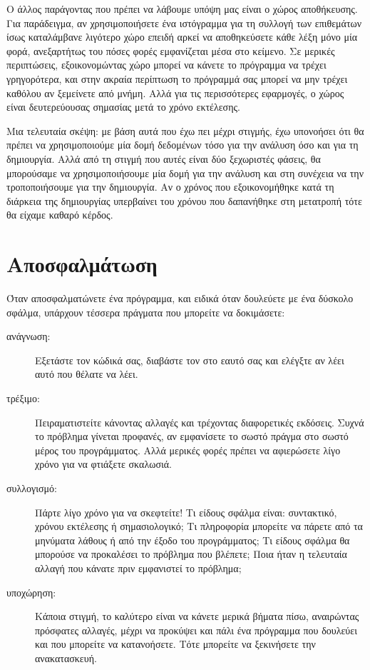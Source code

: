\documentclass[10pt]{book}
\begin{document}
Ο άλλος παράγοντας που πρέπει να λάβουμε υπόψη μας είναι ο χώρος αποθήκευσης. Για παράδειγμα, αν χρησιμοποιήσετε ένα ιστόγραμμα για τη συλλογή των επιθεμάτων ίσως καταλάμβανε λιγότερο χώρο επειδή αρκεί να αποθηκεύσετε κάθε λέξη μόνο μία φορά, ανεξαρτήτως του πόσες φορές εμφανίζεται μέσα στο κείμενο. Σε μερικές περιπτώσεις, εξοικονομώντας χώρο μπορεί να κάνετε το πρόγραμμα να τρέχει γρηγορότερα, και στην ακραία περίπτωση το πρόγραμμά σας μπορεί να μην τρέχει καθόλου αν ξεμείνετε από μνήμη. Αλλά για τις περισσότερες εφαρμογές, ο χώρος είναι δευτερεύουσας σημασίας μετά το χρόνο εκτέλεσης.

Μια τελευταία σκέψη: με βάση αυτά που έχω πει μέχρι στιγμής, έχω υπονοήσει ότι θα πρέπει να χρησιμοποιούμε μία 
δομή δεδομένων τόσο για την ανάλυση όσο και για τη δημιουργία. Αλλά από τη στιγμή που αυτές είναι δύο ξεχωριστές φάσεις, θα μπορούσαμε να χρησιμοποιήσουμε μία δομή για την ανάλυση και στη συνέχεια να την τροποποιήσουμε για την δημιουργία. Αν ο χρόνος που εξοικονομήθηκε κατά τη διάρκεια της δημιουργίας υπερβαίνει του χρόνου που δαπανήθηκε στη μετατροπή τότε θα είχαμε καθαρό κέρδος.


\section{Αποσφαλμάτωση}

Όταν αποσφαλματώνετε ένα πρόγραμμα, και ειδικά όταν δουλεύετε με ένα δύσκολο σφάλμα, 
υπάρχουν τέσσερα πράγματα που μπορείτε να δοκιμάσετε:

\begin{description}

\item [ανάγνωση:]  Εξετάστε τον κώδικά σας, διαβάστε τον στο εαυτό σας και 
ελέγξτε αν λέει αυτό που θέλατε να λέει. 

\item[τρέξιμο:]  Πειραματιστείτε κάνοντας αλλαγές και τρέχοντας διαφορετικές εκδόσεις. 
Συχνά το πρόβλημα γίνεται προφανές, αν εμφανίσετε το σωστό πράγμα στο σωστό μέρος του προγράμματος. 
Αλλά μερικές φορές πρέπει να αφιερώσετε λίγο χρόνο για να φτιάξετε σκαλωσιά.

\item[συλλογισμό:]  Πάρτε λίγο χρόνο για να σκεφτείτε! Τι είδους σφάλμα είναι: συντακτικό, χρόνου εκτέλεσης ή σημασιολογικό; Τι πληροφορία μπορείτε να πάρετε από τα μηνύματα λάθους ή από την έξοδο του προγράμματος; Τι είδους σφάλμα θα μπορούσε να προκαλέσει το πρόβλημα που βλέπετε; Ποια ήταν η τελευταία αλλαγή που κάνατε πριν εμφανιστεί το πρόβλημα;

\item[υποχώρηση:]  Κάποια στιγμή, το καλύτερο είναι να κάνετε μερικά βήματα πίσω, αναιρώντας πρόσφατες αλλαγές, μέχρι να προκύψει και πάλι ένα πρόγραμμα που δουλεύει και που μπορείτε να κατανοήσετε. Τότε μπορείτε να ξεκινήσετε την ανακατασκευή. 

\end{description}
\end{document}

